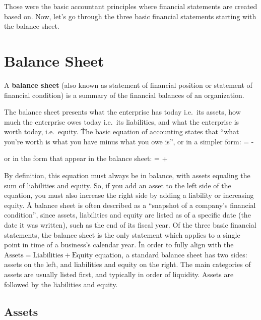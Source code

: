 Those were the basic accountant principles where financial statements are created based on. Now, let's go through the
three basic financial statements starting with the balance sheet.

\section{Balance Sheet}

A \textbf{balance sheet} (also known as statement of financial position or statement of financial condition) is a
summary of the financial balances of an organization.
\ed

The balance sheet presents what the enterprise has today i.e.\ its assets, how much the enterprise owes today i.e.\ its
liabilities, and what the enterprise is worth today, i.e.\ equity. \v

The basic equation of accounting states that ``what you're worth is what you have minus what you owe is'', or in a
simpler form:
\bse
{} =  - 
\ese

or in the form that appear in the balance sheet:
\bse
{} =  + 
\ese

By definition, this equation must always be in balance, with assets equaling the sum of liabilities and equity. So, if
you add an asset to the left side of the equation, you must also increase the right side by adding a liability or
increasing equity. \v

A balance sheet is often described as a ``snapshot of a company's financial condition'', since assets, liabilities
and equity are listed as of a specific date (the date it was written), such as the end of its fiscal year. Of the
three basic financial statements, the balance sheet is the only statement which applies to a single point in time of a
business's calendar year. \v

In order to fully align with the $\text{Assets} = \text{Liabilities} + \text{Equity}$ equation, a standard balance
sheet has two sides: assets on the left, and liabilities and equity on the right. The main categories of assets are
usually listed first, and typically in order of liquidity. Assets are followed by the liabilities and equity.

\subsection{Assets}

